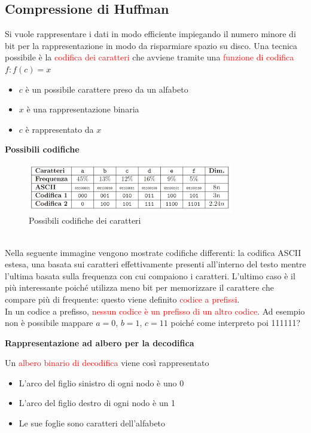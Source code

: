 \documentclass[../cheatSheetAlgoritmi.tex]{subfiles}
\begin{document}
\subsection{Compressione di Huffman}
Si vuole rappresentare i dati in modo efficiente impiegando il numero minore di bit per la rappresentazione in modo da risparmiare spazio su disco. Una tecnica possibile è la \textcolor{red}{codifica dei caratteri} che avviene tramite una \textcolor{red}{funzione di codifica} $f : f(c) = x$
\begin{itemize}
	\item $c$ è un possibile carattere preso da un alfabeto
	\item $x$ è una rappresentazione binaria
	\item $c$ è rappresentato da $x$
\end{itemize}
\textbf{Possibili codifiche}
\begin{figure}[h]
\centering
\includegraphics[width=0.8\textwidth]{../img/Greedy_1.jpg}
\caption{Possibili codifiche dei caratteri}
\end{figure} \\
Nella seguente immagine vengono mostrate codifiche differenti: la codifica ASCII estesa, una basata sui caratteri effettivamente presenti all'interno del testo mentre l'ultima basata sulla frequenza con cui compaiono i caratteri. L'ultimo caso è il più interessante poiché utilizza meno bit per memorizzare il carattere che compare più di frequente: questo viene definito \textcolor{red}{codice a prefissi}.\\
In un codice a prefisso, \textcolor{red}{nessun codice è un prefisso di un altro codice}. Ad esempio non è possibile mappare $a = 0$, $b = 1$, $c = 11$ poiché come interpreto poi 111111?
\newpage
\begin{flushleft}
\textbf{Rappresentazione ad albero per la decodifica}
\end{flushleft}
Un \textcolor{red}{albero binario di decodifica} viene così rappresentato
\begin{itemize}
	\item L'arco del figlio sinistro di ogni nodo è uno 0
	\item L'arco del figlio destro di ogni nodo è un 1
	\item Le sue foglie sono caratteri dell'alfabeto
\end{itemize}
\end{document}
